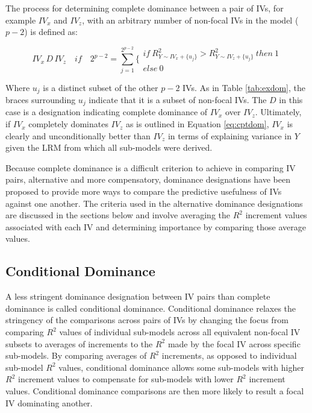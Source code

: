 \documentclass[man]{apa7}
\begin{document}
	The process for determining complete dominance between a pair of IVs, for example $IV_x$ and $IV_z$, with an arbitrary number of non-focal IVs in the model ($p - 2$) is defined as:
	
	\begin{equation}
		IV_x \, D \, IV_z \quad if \quad 2^{p-2} = \sum^{2^{p-2}}_{j=1} \Biggr\{ 
		\begin{array}{l}
			if \ R^2_{Y \sim IV_x + \{u_j\}} > R^2_{Y \sim IV_z + \{u_j\}} \ then \ 1 \\
			else \ 0 
		\end{array}
		\label{eq:cptdom}
	\end{equation}
	
	Where $u_j$ is a distinct subset of the other $p - 2$ IVs.
	As in Table \ref{tab:exdom}, the braces surrounding $u_j$ indicate that it is a subset of non-focal IVs.
	The $D$ in this case is a designation indicating complete dominance of $IV_x$ over $IV_z$.
	Ultimately, if $IV_x$ completely dominates $IV_z$ as is outlined in Equation \ref{eq:cptdom}, $IV_x$ is clearly and unconditionally better than $IV_z$ in terms of explaining variance in $Y$ given the LRM from which all sub-models were derived.	
	
	Because complete dominance is a difficult criterion to achieve in comparing IV pairs, alternative and more compensatory, dominance designations have been proposed to provide more ways to compare the predictive usefulness of IVs against one another.
	The criteria used in the alternative dominance designations are discussed in the sections below and involve averaging the $R^2$ increment values associated with each IV and determining importance by comparing those average values.
	
	\subsection{Conditional Dominance}
	
	A less stringent dominance designation between IV pairs than complete dominance is called conditional dominance.
	Conditional dominance relaxes the stringency of the comparisons across pairs of IVs by changing the focus from comparing $R^2$ values of individual sub-models across all equivalent non-focal IV subsets to averages of increments to the $R^2$ made by the focal IV across specific sub-models.	
	By comparing averages of $R^2$ increments, as opposed to individual sub-model $R^2$ values, conditional dominance allows some sub-models with higher $R^2$ increment values to compensate for sub-models with lower $R^2$ increment values.
	Conditional dominance comparisons are then more likely to result a focal IV dominating another.
	
\end{document}
